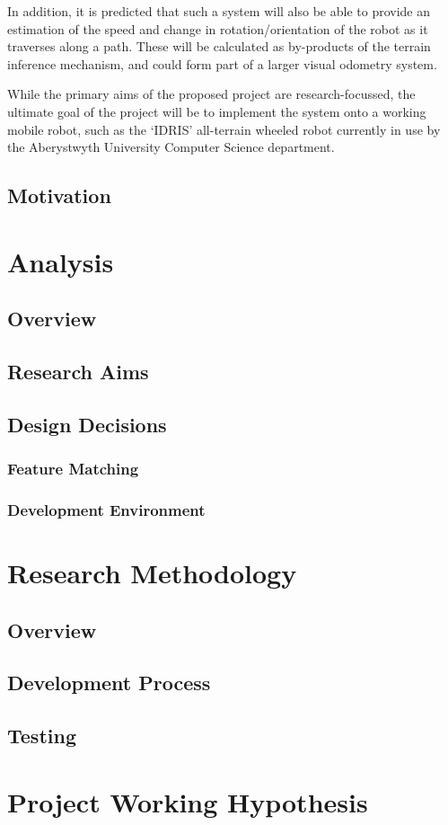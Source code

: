 In addition, it is predicted that such a system will also be able to provide an estimation of the speed and change in rotation/orientation of the robot as it traverses along a path. These will be calculated as by-products of the terrain inference mechanism, and could form part of a larger visual odometry system.

While the primary aims of the proposed project are research-focussed, the ultimate goal of the project will be to implement the system onto a working mobile robot, such as the `IDRIS' all-terrain wheeled robot currently in use by the Aberystwyth University Computer Science department.

\subsection{Motivation}



\section{Analysis}


\subsection{Overview}

\subsection{Research Aims}

\subsection{Design Decisions}

\subsubsection{Feature Matching}

\subsubsection{Development Environment}

\section{Research Methodology}

\subsection{Overview}

\subsection{Development Process}

\subsection{Testing}

\section{Project Working Hypothesis}



